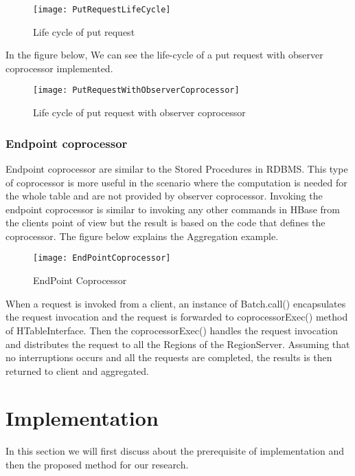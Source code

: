 \documentclass[11pt,a4paper,bibtotoc,idxtotoc,headsepline,footsepline,footexclude,BCOR12mm,DIV13]{scrbook}
\begin{document}
\begin{figure}
	\centering
	\texttt{[image: PutRequestLifeCycle]}
	\caption{Life cycle of put request}
	
\end{figure}

In the figure below, We can see the life-cycle of a put request with observer coprocessor implemented.

\begin{figure}
	\centering
	\texttt{[image: PutRequestWithObserverCoprocessor]}
	\caption{Life cycle of put request with observer coprocessor}
	
\end{figure}

\newpage
\subsection{Endpoint coprocessor}

Endpoint coprocessor are similar to the Stored Procedures in RDBMS. This type of coprocessor is more useful in the scenario where the computation is needed for the whole table and are not provided by observer coprocessor\cite{hbase:coprocessors}. Invoking the endpoint coprocessor is similar to invoking any other commands in HBase from the client\textquotesingle s point of view but the result is based on the code that defines the coprocessor\cite{coprocessor:detail}. The figure below explains the Aggregation example\cite{coprocessor:detail}.

\begin{figure}
	\centering
	\texttt{[image: EndPointCoprocessor]}
	\caption{EndPoint Coprocessor}
	
\end{figure}

When a request is invoked from a client, an instance of Batch.call() encapsulates the request invocation and the request is forwarded to coprocessorExec() method of HTableInterface. Then the coprocessorExec() handles the request invocation and distributes the request to all the Regions of the RegionServer. Assuming that no interruptions occurs and all the requests are completed, the results is then returned to client and aggregated\cite{coprocessor:detail}.


\newpage
\chapter{Implementation}
In this section we will first discuss about the prerequisite of implementation and then the proposed method for our research.
\end{document}
